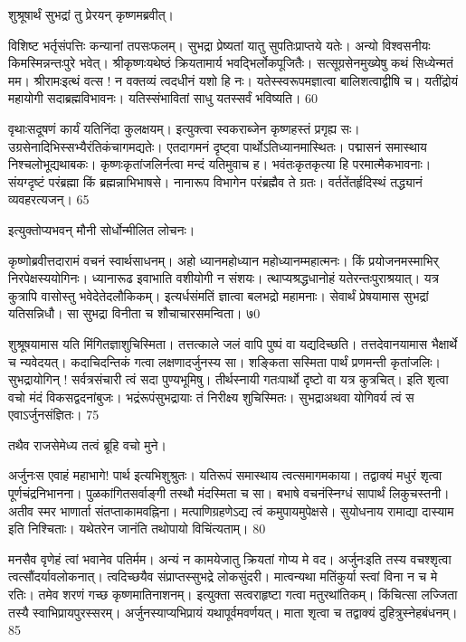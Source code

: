 शुश्रूषार्थं सुभद्रां तु प्रेरयन् कृष्णमब्रवीत्।

विशिष्ट भर्तृसंपत्तिः कन्यानां तपसःफलम्।
सुभद्रा प्रेष्यतां यातु सुपतिःप्राप्तये यतेः।
अन्यो विश्वसनीयः किमस्मिन्नन्तःपुरे भवेत्।
श्रीकृष्णःयथेष्ठं क्रियतामार्य भवद्भिर्लोकपूजितैः।
सत्सूग्रसेनमुख्येषु कथं सिध्येन्मतं मम।
श्रीरामःइत्थं वत्स ! न वक्तव्यं त्वदधीनं यशो हि नः।
यतेस्स्वरूपमज्ञात्वा बालिशत्वाद्वीषि च।
यतींद्रोयं महायोगी सदाब्रह्मविभावनः।
यतिस्संभावितां साधु यतस्सर्वं भविष्यति।
60

वृथाःसदूषणं कार्यं यतिनिंदा कुलक्षयम्।
इत्युक्त्वा स्वकराब्जेन कृष्णहस्तं प्रगृह्य सः।
उग्रसेनादिभिस्सभ्यैरंतिकंचागमद्यतेः।
एतदागमनं दृष्ट्वा पार्थोऽतिध्यानमास्थितः।
पद्मासनं समास्थाय निश्चलोभूद्यथाबकः।
कृष्णःकृतांजलिर्नत्वा मन्दं यतिमुवाच ह।
भवंतःकृतकृत्या हि परमात्मैकभावनाः।
संयग्दृष्टं परंब्रह्मा किं ब्रह्मन्नाभिभाषसे।
नानारूप विभागेन परंब्रह्मैव ते ग्रतः।
वर्ततेंतर्हृदिस्थं तद्ध्यानं व्यवहरत्यजन्।
65

इत्युक्तोप्यभवन् मौनी सोर्धोन्मीलित लोचनः।

कृष्णोब्रवीत्तदारामं वचनं स्वार्थसाधनम्।
अहो ध्यानमहोध्यान महोध्यानम्महात्मनः।
किं प्रयोजनमस्माभिर् निरपेक्षस्ययोगिनः।
ध्यानारूढ इवाभाति वशीयोगी न संशयः।
त्थाप्यश्रद्धधानोहं यतेरन्तःपुराश्रयात्।
यत्र कुत्रापि वासोस्तु भवेदेतेदलौकिकम्।
इत्यर्धसंमतिं ज्ञात्वा बलभद्रो महामनाः।
सेवार्थं प्रेषयामास सुभद्रां यतिसन्निधौ।
सा सुभद्रा विनीता च शौचाचारसमन्विता।
७0

शुश्रूषयामास यति मिंगितज्ञाशुचिस्मिता।
तत्तत्काले जलं वापि पुष्पं वा यद्यदिच्छति।
तत्तदेवानयामास भैक्षार्थे च न्यवेदयत्।
कदाचिदन्तिकं गत्वा लक्षणादर्जुनस्य सा।
शङ्किता सस्मिता पार्थं प्रणमन्ती कृतांजलिः।
सुभद्रायोगिन् ! सर्वत्रसंचारी त्वं सदा पुण्यभूमिषु।
तीर्थस्नायी गतःपार्थो दृष्टो वा यत्र कुत्रचित्।
इति शृत्वा वचो मंदं विकसद्वदनांबुजः।
भद्रंरूपंसुभद्रायाः तं निरीक्ष्य शुचिस्मितः।
सुभद्राअथवा योगिवर्य त्वं स एवाऽर्जुनसंज्ञितः।
75

तथैव राजसेमेध्य तत्वं ब्रूहि वचो मुने।

अर्जुनःस एवाहं महाभागे! पार्थ इत्यभिशुश्रुतः।
यतिरूपं समास्थाय त्वत्समागमकाया।
तद्वाक्यं मधुरं शृत्वा पूर्णचंद्रनिभानना।
पुळकांगितसर्वाङ्गी तस्थौ मंदस्मिता च सा।
बभाषे वचनंस्निग्धं सापार्थं लिकुचस्तनी।
अतीव स्मर भाणार्ता संतप्ताकामवह्निना।
मत्पाणिग्रहणेऽद्य त्वं कमुपायमुपेक्षसे।
सुयोधनाय रामाद्या दास्याम इति निश्चिताः।
यथेतरेन जानंति तथोपायो विचिंत्यताम्।
80

मनसैव वृणेहं त्वां भवानेव पतिर्मम।
अन्यं न कामयेजातु क्रियतां गोप्य मे वद।
अर्जुनःइति तस्य वचश्शृत्वा त्वत्सौंदर्यावलोकनात्।
त्वदिच्छयैव संप्राप्तस्सुभद्रे लोकसुंदरी।
मात्वन्यथा मतिंकुर्या स्त्वां विना न च मे रतिः।
तमेव शरणं गच्छ कृष्णमातिनाशनम्।
इत्युक्ता सत्वराहृष्टा गत्वा मतुरथांतिकम्।
किंचित्सा लज्जिता तस्यै स्वाभिप्रायपुरस्सरम्।
अर्जुनस्याप्यभिप्रायं यथापूर्वमवर्णयत्।
माता शृत्वा च तद्वाक्यं दुहित्रुस्नेहबंधनम्।
85

